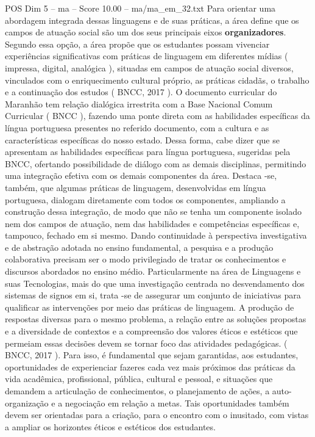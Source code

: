\begin{textsample}{POS Dim 5 – ma – Score 10.00 – ma/ma\_em\_32.txt}
Para orientar uma abordagem integrada dessas linguagens e de suas práticas, a área define que os campos de atuação social são um dos seus principais eixos \textbf{organizadores}.
Segundo essa opção, a área propõe que os estudantes possam vivenciar experiências significativas com práticas de linguagem em diferentes mídias ( impressa, digital, analógica ), situadas em campos de atuação social diversos, vinculados com o enriquecimento cultural próprio, as práticas cidadãs, o trabalho e a continuação dos estudos ( BNCC, 2017 ).
O documento curricular do Maranhão tem relação dialógica irrestrita com a Base Nacional Comum Curricular ( BNCC ), fazendo uma ponte direta com as habilidades específicas da língua portuguesa presentes no referido documento, com a cultura e as características específicas do nosso estado.
Dessa forma, cabe dizer que se apresentam as habilidades específicas para língua portuguesa, sugeridas pela BNCC, ofertando possibilidade de diálogo com as demais disciplinas, permitindo uma integração efetiva com os demais componentes da área.
Destaca -se, também, que algumas práticas de linguagem, desenvolvidas em língua portuguesa, dialogam diretamente com todos os componentes, ampliando a construção dessa integração, de modo que não se tenha um componente isolado nem dos campos de atuação, nem das habilidades e competências específicas e, tampouco, fechado em si mesmo.
Dando continuidade à perspectiva investigativa e de abstração adotada no ensino fundamental, a pesquisa e a produção colaborativa precisam ser o modo privilegiado de tratar os conhecimentos e discursos abordados no ensino médio.
Particularmente na área de Linguagens e suas Tecnologias, mais do que uma investigação centrada no desvendamento dos sistemas de signos em si, trata -se de assegurar um conjunto de iniciativas para qualificar as intervenções por meio das práticas de linguagem.
A produção de respostas diversas para o mesmo problema, a relação entre as soluções propostas e a diversidade de contextos e a compreensão dos valores éticos e estéticos que permeiam essas decisões devem se tornar foco das atividades pedagógicas. ( BNCC, 2017 ).
Para isso, é fundamental que sejam garantidas, aos estudantes, oportunidades de experienciar fazeres cada vez mais próximos das práticas da vida acadêmica, profissional, pública, cultural e pessoal, e situações que demandem a articulação de conhecimentos, o planejamento de ações, a auto-organização e a negociação em relação a metas.
Tais oportunidades também devem ser orientadas para a criação, para o encontro com o inusitado, com vistas a ampliar os horizontes éticos e estéticos dos estudantes.

\end{textsample}
